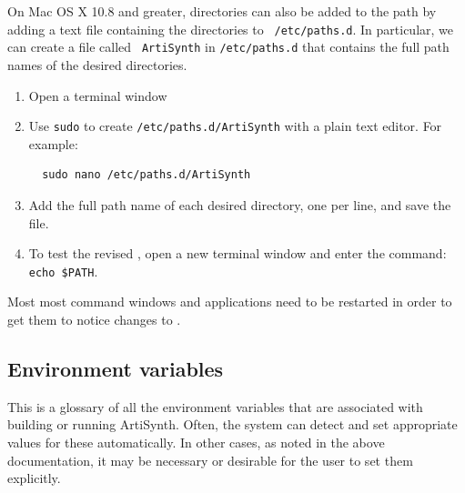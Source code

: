 \ifMacOS
On Mac OS X 10.8 and greater, directories can also be added to the
path by adding a text file containing the directories to {\tt
/etc/paths.d}.  In particular, we can create a file called {\tt
ArtiSynth} in {\tt /etc/paths.d} that contains the full path names of
the desired directories.

\begin{enumerate}

\item Open a terminal window

\item Use {\tt sudo} to create {\tt /etc/paths.d/ArtiSynth} with a plain
text editor. For example:
\begin{verbatim}
  sudo nano /etc/paths.d/ArtiSynth
\end{verbatim}

\item Add the full path name of each desired directory, one per line,
and save the file.

\item To test the revised \PATH{}, open a new terminal
window and enter the command: {\tt echo \$PATH}.

\end{enumerate}

\fi %
\fi %

\begin{sideblock}
Most most command windows and applications need to be restarted in
order to get them to notice changes to \PATH{}.
\end{sideblock}

\subsection{Environment variables}
\label{EnvironmentVariables}

This is a glossary of all the environment variables that are
associated with building or running ArtiSynth. Often, the system can
detect and set appropriate values for these automatically. In other
cases, as noted in the above documentation, it may be necessary or
desirable for the user to set them explicitly.

